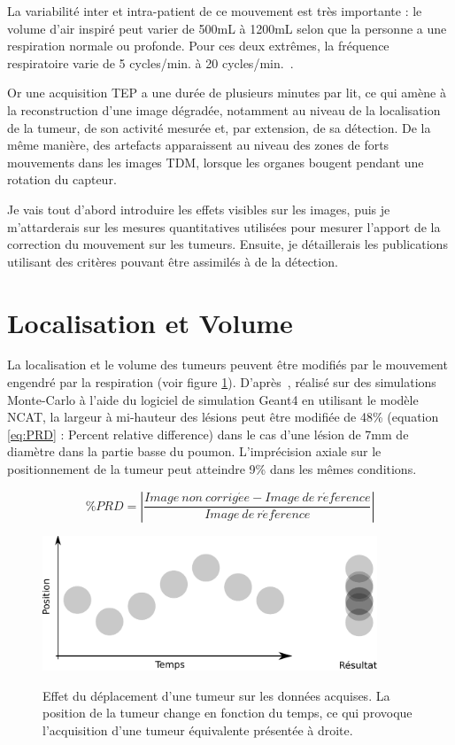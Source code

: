 La variabilité inter et intra-patient de ce mouvement est très importante : le volume d'air inspiré peut varier de 500mL à 1200mL selon que la personne a une respiration normale ou profonde. Pour ces deux extrêmes, la fréquence respiratoire varie de 5 cycles/min. à 20 cycles/min.~\cite{sherwood2006fundamentals}.

Or une acquisition TEP a une durée de plusieurs minutes par lit, ce qui amène à la reconstruction d'une image dégradée, notamment au niveau de la localisation de la tumeur, de son activité mesurée et, par extension, de sa détection. De la même manière, des artefacts apparaissent au niveau des zones de forts mouvements dans les images TDM, lorsque les organes bougent pendant une rotation du capteur.

Je vais tout d'abord introduire les effets visibles sur les images, puis je m'attarderais sur les mesures quantitatives utilisées pour mesurer l'apport de la correction du mouvement sur les tumeurs. Ensuite, je détaillerais les publications utilisant des critères pouvant être assimilés à de la détection.

\section{Localisation et Volume}


La localisation et le volume des tumeurs peuvent être modifiés par le mouvement engendré par la respiration (voir figure \ref{fig:effetMvt}). D'après~\cite{lamare2007respiratory}, réalisé sur des simulations Monte-Carlo à l'aide du logiciel de simulation Geant4\cite{jan2004gate} en utilisant le modèle NCAT\cite{segars2001These}, la largeur à mi-hauteur des lésions peut être modifiée de 48\% (equation \ref{eq:PRD} : Percent relative difference) dans le cas d'une lésion de 7mm de diamètre dans la partie basse du poumon. L'imprécision axiale sur le positionnement de la tumeur peut atteindre 9\% dans les mêmes conditions.

\begin{equation}
\%PRD= \left| \frac{Image~non~corrig\acute{e}e - Image~de~r\acute{e}f\acute{e}rence}{Image~de~r\acute{e}f\acute{e}rence} \right|
\label{eq:PRD}
\end{equation}


\begin{figure}[h!]
    \begin{center}
            \includegraphics[width=10cm]{images/moyennageImage} \\
    \end{center}
    \caption{Effet du déplacement d'une tumeur sur les données acquises. La position de la tumeur change en fonction du temps, ce qui provoque l'acquisition d'une tumeur équivalente présentée à droite.}
    \label{fig:effetMvt}
\end{figure}


